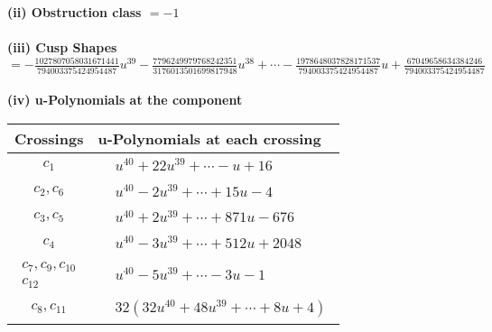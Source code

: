 \documentclass[1p]{elsarticle_modified}
\theoremstyle{definition}
\begin{document}
\flushleft \textbf{(ii) Obstruction class $= -1$}\\~\\
\flushleft \textbf{(iii) Cusp Shapes $= -\frac{1027807058031671441}{794003375424954487} u^{39}-\frac{7796249979768242351}{3176013501699817948} u^{38}+\cdots-\frac{1978648037828171537}{794003375424954487} u+\frac{67049658634384246}{794003375424954487}$}\\~\\
\newpage\renewcommand{\arraystretch}{1}
\flushleft \textbf{(iv) u-Polynomials at the component}\newline \\
\begin{tabular}{m{50pt}|m{274pt}}
Crossings & \hspace{64pt}u-Polynomials at each crossing \\
\hline $$\begin{aligned}c_{1}\end{aligned}$$&$\begin{aligned}
&u^{40}+22 u^{39}+\cdots- u+16
\end{aligned}$\\
\hline $$\begin{aligned}c_{2},c_{6}\end{aligned}$$&$\begin{aligned}
&u^{40}-2 u^{39}+\cdots+15 u-4
\end{aligned}$\\
\hline $$\begin{aligned}c_{3},c_{5}\end{aligned}$$&$\begin{aligned}
&u^{40}+2 u^{39}+\cdots+871 u-676
\end{aligned}$\\
\hline $$\begin{aligned}c_{4}\end{aligned}$$&$\begin{aligned}
&u^{40}-3 u^{39}+\cdots+512 u+2048
\end{aligned}$\\
\hline $$\begin{aligned}c_{7},c_{9},c_{10}\\c_{12}\end{aligned}$$&$\begin{aligned}
&u^{40}-5 u^{39}+\cdots-3 u-1
\end{aligned}$\\
\hline $$\begin{aligned}c_{8},c_{11}\end{aligned}$$&$\begin{aligned}
&32(32 u^{40}+48 u^{39}+\cdots+8 u+4)
\end{aligned}$\\
\hline
\end{tabular}\\~\\
\end{document}
